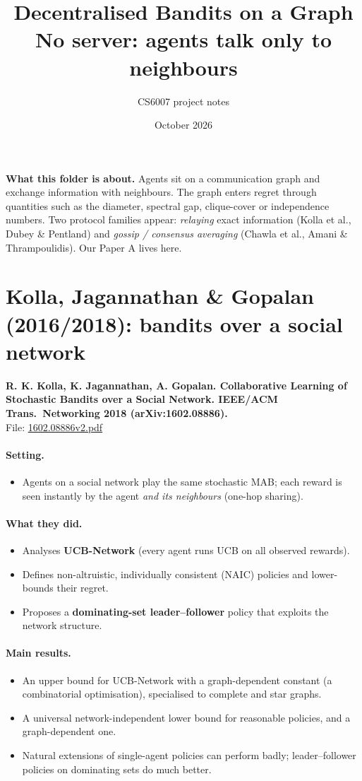 \documentclass[11pt]{article}
\title{Decentralised Bandits on a Graph\\[2pt]\large No server: agents talk only to neighbours}
\author{CS6007 project notes}
\date{October 2026}
\newcommand{\file}[1]{\url{#1}}
\begin{document}
\maketitle
\textbf{What this folder is about.} Agents sit on a communication graph and exchange
information with neighbours. The graph enters regret through quantities such as the diameter,
spectral gap, clique-cover or independence numbers. Two protocol families appear: \emph{relaying}
exact information (Kolla et al., Dubey \& Pentland) and \emph{gossip / consensus averaging}
(Chawla et al., Amani \& Thrampoulidis). Our Paper A lives here.
\tableofcontents
\bigskip
\section{Kolla, Jagannathan \& Gopalan (2016/2018): bandits over a social network}
\textbf{R. K. Kolla, K. Jagannathan, A. Gopalan. Collaborative Learning of Stochastic Bandits over a Social Network. IEEE/ACM Trans.\ Networking 2018 (arXiv:1602.08886).}\\ File: \file{1602.08886v2.pdf}
\paragraph{Setting.}
\begin{itemize}\item Agents on a social network play the same stochastic MAB; each reward is seen instantly by the agent \emph{and its neighbours} (one-hop sharing).\end{itemize}
\paragraph{What they did.}
\begin{itemize}\item Analyses \textbf{UCB-Network} (every agent runs UCB on all observed rewards).\item Defines non-altruistic, individually consistent (NAIC) policies and lower-bounds their regret.\item Proposes a \textbf{dominating-set leader--follower} policy that exploits the network structure.\end{itemize}
\paragraph{Main results.}
\begin{itemize}\item An upper bound for UCB-Network with a graph-dependent constant (a combinatorial optimisation), specialised to complete and star graphs.\item A universal network-independent lower bound for reasonable policies, and a graph-dependent one.\item Natural extensions of single-agent policies can perform badly; leader--follower policies on dominating sets do much better.\end{itemize}
\end{document}
